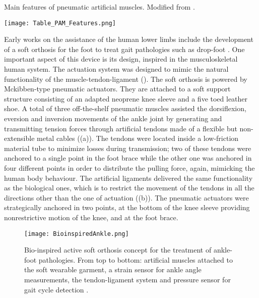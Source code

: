 \begin{table}[ht!]
  \caption[Main features of pneumatic artificial muscles.]{Main features of pneumatic artificial muscles. Modified from \cite{Belforte2014}.}
  \label{tbl:PMAs_feats}
  \centering
  \texttt{[image: Table\_PAM\_Features.png]}
\end{table}

Early works on the assistance of the human lower limbs include the development of a soft orthosis for the foot to treat gait pathologies such as drop-foot \cite{park2011bio,Hamedi2015}. One important aspect of this device is its design, inspired in the musculoskeletal human system. The actuation system was designed to mimic the natural functionality of the muscle-tendon-ligament (). The soft orthosis is powered by Mckibben-type pneumatic actuators. They are attached to a soft support structure consisting of an adapted neoprene knee sleeve and a five toed leather shoe. A total of three off-the-shelf pneumatic muscles assisted the dorsiflexion, eversion and inversion movements of the ankle joint by generating and transmitting tension forces through artificial tendons made of a flexible but non-extensible metal cables ((a)). The tendons were located inside a low-friction material tube to minimize losses during transmission; two of these tendons were anchored to a single point in the foot brace while the other one was anchored in four different points in order to distribute the pulling force, again, mimicking the human body behaviour. The artificial ligaments delivered the same functionality as the biological ones, which is to restrict the movement of the tendons in all the directions other than the one of actuation ((b)). The pneumatic actuators were strategically anchored in two points, at the bottom of the knee sleeve providing nonrestrictive motion of the knee, and at the foot brace.
\begin{figure}[hbt!]
    \centering
    \texttt{[image: BioinspiredAnkle.png]}
    \caption[Bio-inspired active soft orthosis concept for the treatment of ankle-foot pathologies. From top to bottom: artificial muscles attached to the soft wearable garment, a strain sensor for ankle angle measurements, the tendon-ligament system and pressure sensor for gait cycle detection.]{Bio-inspired active soft orthosis concept for the treatment of ankle-foot pathologies. From top to bottom: artificial muscles attached to the soft wearable garment, a strain sensor for ankle angle measurements, the tendon-ligament system and pressure sensor for gait cycle detection \cite{park2011bio}. }
    \label{fig:bio_ankle}
\end{figure}
